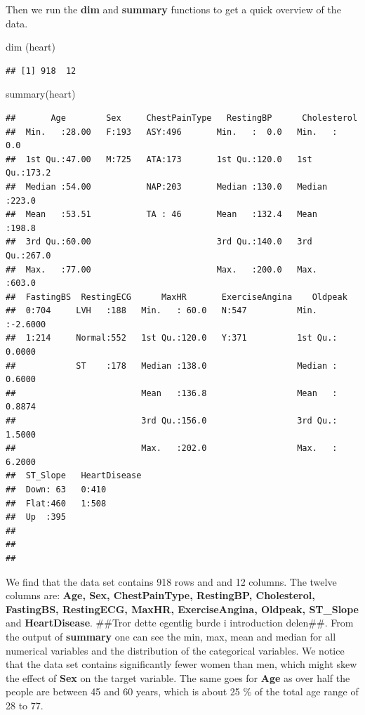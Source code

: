 \documentclass[
]{article}
\newenvironment{Shaded}{\begin{snugshade}}{\end{snugshade}}
\newcommand{\FunctionTok}[1]{\textcolor[rgb]{0.00,0.00,0.00}{#1}}
\newcommand{\NormalTok}[1]{#1}
\begin{document}
Then we run the \textbf{dim} and \textbf{summary} functions to get a
quick overview of the data.

\begin{Shaded}
\begin{Highlighting}[]
\FunctionTok{dim}\NormalTok{ (heart)}
\end{Highlighting}
\end{Shaded}

\begin{verbatim}
## [1] 918  12
\end{verbatim}

\begin{Shaded}
\begin{Highlighting}[]
\FunctionTok{summary}\NormalTok{(heart)}
\end{Highlighting}
\end{Shaded}

\begin{verbatim}
##       Age        Sex     ChestPainType   RestingBP      Cholesterol   
##  Min.   :28.00   F:193   ASY:496       Min.   :  0.0   Min.   :  0.0  
##  1st Qu.:47.00   M:725   ATA:173       1st Qu.:120.0   1st Qu.:173.2  
##  Median :54.00           NAP:203       Median :130.0   Median :223.0  
##  Mean   :53.51           TA : 46       Mean   :132.4   Mean   :198.8  
##  3rd Qu.:60.00                         3rd Qu.:140.0   3rd Qu.:267.0  
##  Max.   :77.00                         Max.   :200.0   Max.   :603.0  
##  FastingBS  RestingECG      MaxHR       ExerciseAngina    Oldpeak       
##  0:704     LVH   :188   Min.   : 60.0   N:547          Min.   :-2.6000  
##  1:214     Normal:552   1st Qu.:120.0   Y:371          1st Qu.: 0.0000  
##            ST    :178   Median :138.0                  Median : 0.6000  
##                         Mean   :136.8                  Mean   : 0.8874  
##                         3rd Qu.:156.0                  3rd Qu.: 1.5000  
##                         Max.   :202.0                  Max.   : 6.2000  
##  ST_Slope   HeartDisease
##  Down: 63   0:410       
##  Flat:460   1:508       
##  Up  :395               
##                         
##                         
## 
\end{verbatim}

We find that the data set contains 918 rows and and 12 columns. The
twelve columns are: \textbf{Age, Sex, ChestPainType, RestingBP,
Cholesterol, FastingBS, RestingECG, MaxHR, ExerciseAngina, Oldpeak,
ST\_Slope} and \textbf{HeartDisease}. \#\#Tror dette egentlig burde i
introduction delen\#\#. From the output of \textbf{summary} one can see
the min, max, mean and median for all numerical variables and the
distribution of the categorical variables. We notice that the data set
contains significantly fewer women than men, which might skew the effect
of \textbf{Sex} on the target variable. The same goes for \textbf{Age}
as over half the people are between 45 and 60 years, which is about 25
\% of the total age range of 28 to 77.
\end{document}
